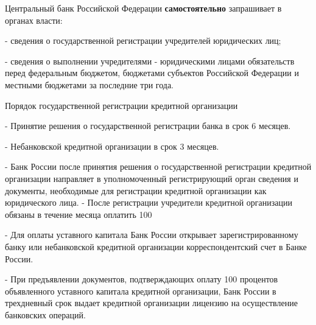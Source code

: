 \documentclass[_Banking_p1.tex]{subfiles}
\begin{document}
\begin{frame}
Центральный банк Российской Федерации \textbf{самостоятельно }запрашивает в органах власти:

- сведения о государственной регистрации учредителей юридических лиц;

- сведения о выполнении учредителями - юридическими лицами обязательств перед федеральным бюджетом, бюджетами субъектов Российской Федерации и местными бюджетами за последние три года. 
\end{frame}
\begin{frame}[allowframebreaks]{\setfontsize{16pt} Порядок государственной регистрации кредитной организации}

- Принятие решения о государственной регистрации банка в срок 6 месяцев.

- Небанковской кредитной организации в срок 3 месяцев.

- Банк России после принятия решения о государственной регистрации кредитной организации направляет в уполномоченный регистрирующий орган сведения и документы, необходимые для регистрации кредитной организации как юридического лица.
\pagebreak
- После регистрации учредители кредитной организации обязаны в течение месяца оплатить 100%

- Для оплаты уставного капитала Банк России открывает зарегистрированному банку или  небанковской кредитной организации корреспондентский счет в Банке России. 

- При предъявлении документов, подтверждающих оплату 100 процентов объявленного уставного капитала кредитной организации, Банк России в трехдневный срок выдает кредитной организации лицензию на осуществление банковских операций.
\end{frame}
\end{document}
